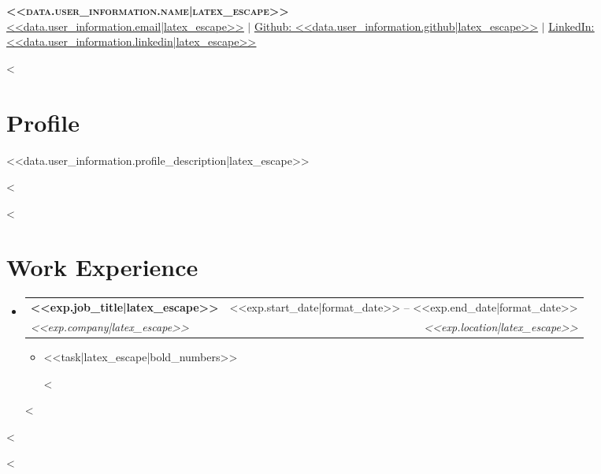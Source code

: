 \documentclass[letterpaper,11pt]{article}
\makeatletter
\newcommand{\resumeItem}[1]{
  \item\small{
    {#1 \vspace{-2pt}}
  }
}
\newcommand{\resumeSubheading}[4]{
  \vspace{-2pt}\item
    \begin{tabular*}{0.97\textwidth}[t]{l@{\extracolsep{\fill}}r}
      \textbf{#1} & #2 \\
      \textit{\small#3} & \textit{\small #4} \\
    \end{tabular*}\vspace{-7pt}
}
\newcommand{\resumeSubHeadingListStart}{\begin{itemize}[leftmargin=0.15in, label={}]}
\newcommand{\resumeSubHeadingListEnd}{\end{itemize}}
\newcommand{\resumeItemListStart}{\begin{itemize}}
\newcommand{\resumeItemListEnd}{\end{itemize}\vspace{-5pt}}
\makeatother
\begin{document}
\begin{center}
    \textbf{\Huge \scshape <<data.user_information.name|latex_escape>>} \\ \vspace{1pt}
    \href{mailto:<<data.user_information.email|latex_escape>>}{\underline{<<data.user_information.email|latex_escape>>}} $|$
    \href{<<data.user_information.github|latex_escape>>}{\underline{Github: <<data.user_information.github|latex_escape>>}} $|$
    \href{<<data.user_information.linkedin|latex_escape|lower|replace(" ", "-")>>}{\underline{LinkedIn: <<data.user_information.linkedin|latex_escape>>}}
\end{center}

<%
\section{Profile}
 \begin{itemize}[leftmargin=0.15in, label={}]
    \small{\item{
     <<data.user_information.profile_description|latex_escape>>
    }}
 \end{itemize}
<%

<%
\section{Work Experience}
  \resumeSubHeadingListStart
    <%
    \resumeSubheading
      {<<exp.job_title|latex_escape>>}{<<exp.start_date|format_date>> -- <<exp.end_date|format_date>>}
      {<<exp.company|latex_escape>>}{<<exp.location|latex_escape>>}
      \resumeItemListStart
        <%
        \resumeItem{<<task|latex_escape|bold_numbers>>}
        <%
      \resumeItemListEnd
    <%
  \resumeSubHeadingListEnd
<%

<%
\end{document}
